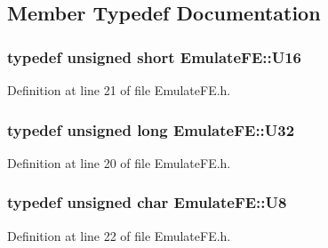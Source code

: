\subsection{Member Typedef Documentation}
\hypertarget{classEmulateFE_ae3af71615d90d5e7ee4de109e8a79c5f}{
\subsubsection[{U16}]{\setlength{\rightskip}{0pt plus 5cm}typedef unsigned short {\bf EmulateFE::U16}}}
\label{classEmulateFE_ae3af71615d90d5e7ee4de109e8a79c5f}


Definition at line 21 of file EmulateFE.h.\hypertarget{classEmulateFE_abc39ad2fcef684d453760193ac4ddd49}{
\subsubsection[{U32}]{\setlength{\rightskip}{0pt plus 5cm}typedef unsigned long {\bf EmulateFE::U32}}}
\label{classEmulateFE_abc39ad2fcef684d453760193ac4ddd49}


Definition at line 20 of file EmulateFE.h.\hypertarget{classEmulateFE_a8aa884f739fca2855ff8fb6bf3cddcff}{
\subsubsection[{U8}]{\setlength{\rightskip}{0pt plus 5cm}typedef unsigned char {\bf EmulateFE::U8}}}
\label{classEmulateFE_a8aa884f739fca2855ff8fb6bf3cddcff}


Definition at line 22 of file EmulateFE.h.

